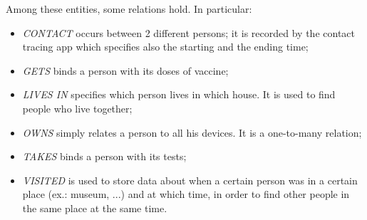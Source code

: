 \documentclass{article}
\begin{document}
Among these entities, some relations hold. In particular:
\begin{itemize}
    \item \textit{CONTACT} occurs between 2 different persons; it is recorded by the contact tracing app which specifies also the starting and the ending time;
    \item \textit{GETS} binds a person with its doses of vaccine;
    \item \textit{LIVES IN} specifies which person lives in which house. It is used to find people who live together;
    \item \textit{OWNS} simply relates a person to all his devices. It is a one-to-many relation;
    \item \textit{TAKES} binds a person with its tests;
    \item \textit{VISITED} is used to store data about when a certain person was in a certain place (ex.: museum, ...) and at which time, in order to find other people in the same place at the same time.
\end{itemize}
\newpage
\end{document}
